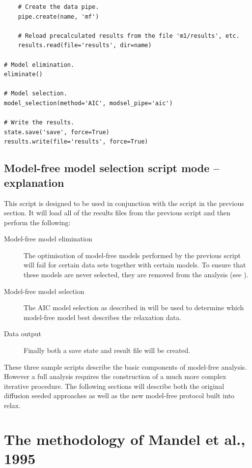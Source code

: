 \begin{htmlonly}
\begin{htmlonly}
\begin{lstlisting}
    # Create the data pipe.
    pipe.create(name, 'mf')
    
    # Reload precalculated results from the file 'm1/results', etc.
    results.read(file='results', dir=name)

# Model elimination.
eliminate()

# Model selection.
model_selection(method='AIC', modsel_pipe='aic')

# Write the results.
state.save('save', force=True)
results.write(file='results', force=True)
\end{lstlisting}



\subsection{Model-free model selection script mode -- explanation}

This script is designed to be used in conjunction with the  script in the previous section.
It will load all of the results files from the previous script and then perform the following:
\begin{description}
  \item[Model-free model elimination]  The optimisation of model-free models performed by the previous script will fail for certain data sets together with certain models.
    To ensure that these models are never selected, they are removed from the analysis (see \citet{dAuvergneGooley06}).
  \item[Model-free model selection]  The AIC model selection as described in \citet{dAuvergneGooley03} will be used to determine which model-free model best describes the relaxation data.
  \item[Data output]  Finally both a save state and result file will be created.
\end{description}

These three sample scripts describe the basic components of model-free analysis.
However a full analysis requires the construction of a much more complex iterative procedure.
The following sections will describe both the original diffusion seeded approaches as well as the new model-free protocol built into relax.



\section{The methodology of Mandel et al., 1995}
\label{sect: Mandel 1995}


\end{htmlonly}
\end{htmlonly}
